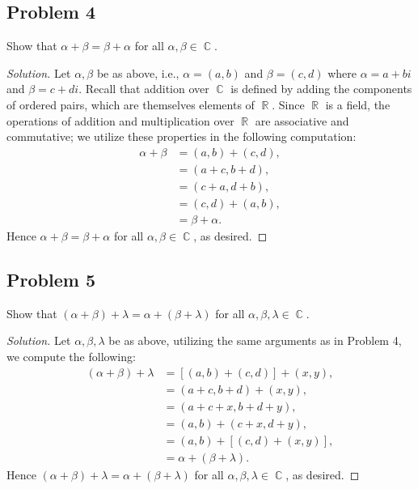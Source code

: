 \documentclass[letterpaper, 12pt]{amsart}
\DeclareMathOperator{\R}{\mathbb{R}}
\DeclareMathOperator{\C}{\mathbb{C}}
\theoremstyle{definition}  %
\begin{document}
		\subsection*{Problem 4}
		Show that $\alpha + \beta = \beta + \alpha$ for all $\alpha, \beta \in \C$.

		\begin{proof}[Solution]
		Let $\alpha,\beta$ be as above, i.e., $\alpha = (a,b)$ and $\beta = (c,d)$ where $\alpha = a + bi$ and $\beta = c + di$.
		Recall that addition over $\C$ is defined by adding the components of ordered pairs, which are themselves elements of $\R$.
		Since $\R$ is a field, the operations of addition and multiplication over $\R$ are associative and commutative; we utilize these properties in the following computation:
			\begin{align*}
			\alpha + \beta &= (a,b) + (c,d), \\
			&= (a + c, b + d), \\
			&= (c + a, d + b), \\
			&= (c,d) + (a,b), \\
			&= \beta + \alpha.
			\end{align*}
		Hence $\alpha + \beta = \beta + \alpha$ for all $\alpha, \beta \in \C$, as desired.
		\end{proof}

		\subsection*{Problem 5}
		Show that $(\alpha + \beta) + \lambda = \alpha + (\beta + \lambda)$ for all $\alpha, \beta, \lambda \in \C$.

		\begin{proof}[Solution]
		Let $\alpha, \beta, \lambda$ be as above, utilizing the same arguments as in Problem 4, we compute the following:
			\begin{align*}
			(\alpha + \beta) + \lambda &= [(a,b) + (c,d)] + (x,y), \\
			&= (a + c, b + d) + (x,y), \\
			&= (a + c + x, b + d + y), \\
			&= (a,b) + (c + x, d + y), \\
			&= (a,b) + [(c,d) + (x,y)], \\
			&= \alpha + (\beta + \lambda).
			\end{align*}
		Hence $(\alpha + \beta) + \lambda = \alpha + (\beta + \lambda)$ for all $\alpha, \beta, \lambda \in \C$, as desired.
		\end{proof}
\end{document}
